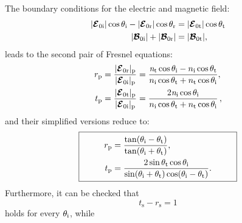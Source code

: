 The boundary conditions for the electric and magnetic field:
\begin{subequations}
\begin{align}
|\boldsymbol{\mathcal{E}}_{0 \textrm{i}}|\cos\theta_{\textrm{i}} - |\boldsymbol{\mathcal{E}}_{0 \textrm{r}}|\cos\theta_{\textrm{r}} &= 
|\boldsymbol{\mathcal{E}}_{0 \textrm{t}}|\cos\theta_{\textrm{t}}\\
|\boldsymbol{\mathcal{B}}_{0 \textrm{i}}| + 
|\boldsymbol{\mathcal{B}}_{0 \textrm{r}}| &= 
|\boldsymbol{\mathcal{B}}_{0 \textrm{t}}|,
\end{align}
\end{subequations}
leads to the second pair of Fresnel equations:
\begin{equation}\label{Fresnel_parallel}
\begin{split}
r_{\textrm{p}} & = \frac{|\boldsymbol{\mathcal{E}}_{0 \textrm{r}}|_{\textrm{p}}}{|\boldsymbol{\mathcal{E}}_{0\textrm{i}}|_\textrm{p}} = \frac{\textit{n}_\textrm{t}\cos\theta_\textrm{i}-n_\textrm{i} \cos\theta_\textrm{t}}{n_\textrm{i} \cos\theta_\textrm{t}+n_\textrm{t}\cos\theta_\textrm{i}},\\
t_{\textrm{p}} & =\frac{|\boldsymbol{\mathcal{E}}_{0 \textrm{t}}|_{\textrm{p}}}{|\boldsymbol{\mathcal{E}}_{0\textrm{i}}|_\textrm{p}} =  \frac{2\textit{n}_\textrm{i}\cos\theta_\textrm{i}}{n_\textrm{i}\cos\theta_\textrm{t}+n_\textrm{t}\cos\theta_\textrm{i}}\,,
\end{split}
\end{equation}
and their simplified versions reduce to:
\begin{equation}
\fbox{\begin{minipage}{18em}
\begin{equation*} \label{simple_Fresnel}
\begin{split}
r_{\textrm{p}} & =  \frac{\tan(\myangle_\textrm{i}-\myangle_\textrm{t})}{\tan(\myangle_\textrm{i}+\myangle_\textrm{t})},\\
t_{\textrm{p}} & = \frac{2\sin \myangle_\textrm{t} \cos \myangle_\textrm{i}}{\sin(\myangle_\textrm{i}+\myangle_\textrm{t})\cos(\myangle_\textrm{i}- \myangle_\textrm{t})}.
\end{split}
\end{equation*}
\end{minipage}}
\end{equation}
Furthermore, it can be checked that
 \begin{equation}
t_\textrm{s}-r_\textrm{s} = 1
\end{equation}
holds for every $\theta_{\textrm{i}}$, while 
